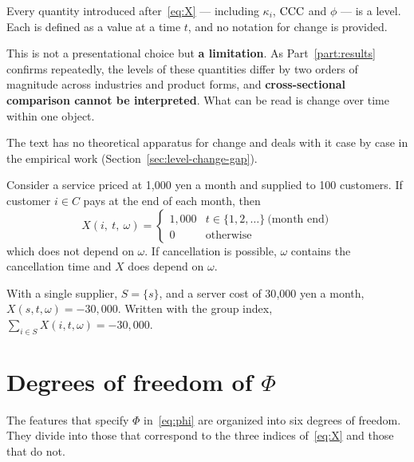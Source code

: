 \begin{remark}
\label{rem:level-vs-change}
Every quantity introduced after~\eqref{eq:X} --- including $\kappa_i$, $\mathrm{CCC}$ and $\phi$ ---
is a level. Each is defined as a value at a time $t$, and no notation for change is
provided.

This is not a presentational choice but \textbf{a limitation}. As Part~\ref{part:results}
confirms repeatedly, the levels of these quantities differ by two orders of magnitude across
industries and product forms, and \textbf{cross-sectional comparison cannot be interpreted}.
What can be read is change over time within one object.

The text has no theoretical apparatus for change and deals with it case by case in the
empirical work (Section~\ref{sec:level-change-gap}).
\end{remark}

\begin{example}
\label{ex:triple-index}
Consider a service priced at 1{,}000 yen a month and supplied to 100 customers.
If customer $i\in C$ pays at the end of each month, then
\[
X(i,\ t,\ \omega) = \begin{cases} 1{,}000 & t \in \{1,2,\dots\}\ \text{(month end)} \\ 0 & \text{otherwise}\end{cases}
\]
which does not depend on $\omega$. If cancellation is possible, $\omega$ contains the
cancellation time and $X$ does depend on $\omega$.

With a single supplier, $S=\{s\}$, and a server cost of 30{,}000 yen a month,
$X(s,t,\omega)=-30{,}000$. Written with the group index,
$\sum_{i\in S}X(i,t,\omega)=-30{,}000$.
\end{example}


\section{Degrees of freedom of \texorpdfstring{$\Phi$}{Phi}}
\label{sec:dof}

The features that specify $\Phi$ in~\eqref{eq:phi} are organized into six degrees of
freedom. They divide into those that correspond to the three indices of~\eqref{eq:X} and
those that do not.

